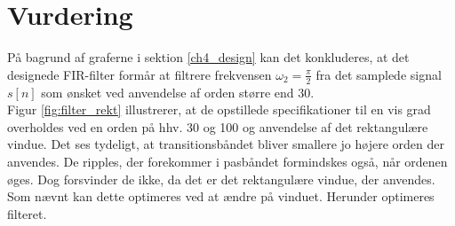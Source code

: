 \section{Vurdering}
På bagrund af graferne i sektion \ref{ch4_design} kan det konkluderes, at det designede FIR-filter formår at filtrere frekvensen $\omega_2=\frac{\pi}{2}$ fra det samplede signal $s[n]$ som ønsket ved anvendelse af orden større end $30$. \\
Figur \ref{fig:filter_rekt} illustrerer, at de opstillede specifikationer til en vis grad overholdes ved en orden på hhv. 30 og 100 og anvendelse af det rektangulære vindue. Det ses tydeligt, at transitionsbåndet bliver smallere jo højere orden der anvendes. De ripples, der forekommer i pasbåndet formindskes også, når ordenen øges. Dog forsvinder de ikke, da det er det rektangulære vindue, der anvendes. Som nævnt kan dette optimeres ved at ændre på vinduet. Herunder optimeres filteret.

